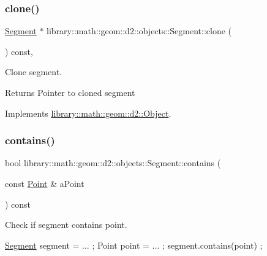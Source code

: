 \subsubsection{\texorpdfstring{clone()}{clone()}}
{\footnotesize\ttfamily \hyperlink{classlibrary_1_1math_1_1geom_1_1d2_1_1objects_1_1_segment}{Segment} $\ast$ library\+::math\+::geom\+::d2\+::objects\+::\+Segment\+::clone (\begin{DoxyParamCaption}{ }\end{DoxyParamCaption}) const\hspace{0.3cm}{\ttfamily [override]}, {\ttfamily [virtual]}}



Clone segment. 

\begin{DoxyReturn}{Returns}
Pointer to cloned segment 
\end{DoxyReturn}


Implements \hyperlink{classlibrary_1_1math_1_1geom_1_1d2_1_1_object_a5c26ae4120edb24f6463d65a9cef247d}{library\+::math\+::geom\+::d2\+::\+Object}.

\mbox{\label{classlibrary_1_1math_1_1geom_1_1d2_1_1objects_1_1_segment_ac72deb794d609e44ccddf1cde25a7c2d}} 
\subsubsection{\texorpdfstring{contains()}{contains()}\hspace{0.1cm}{\footnotesize\ttfamily [1/2]}}
{\footnotesize\ttfamily bool library\+::math\+::geom\+::d2\+::objects\+::\+Segment\+::contains (\begin{DoxyParamCaption}\item[{const \hyperlink{classlibrary_1_1math_1_1geom_1_1d2_1_1objects_1_1_point}{Point} \&}]{a\+Point }\end{DoxyParamCaption}) const}



Check if segment contains point. 


\begin{DoxyCode}
\hyperlink{classlibrary_1_1math_1_1geom_1_1d2_1_1objects_1_1_segment_a44ba44fd5f02a02fe34c40223b38fa8f}{Segment} segment = ... ;
Point point = ... ;
segment.contains(point) ;
\end{DoxyCode}



